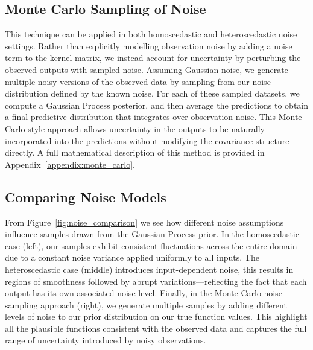 \documentclass{ucdgradtaughtthesis}
\begin{document}
\subsection{Monte Carlo Sampling of Noise}  

This technique can be applied in both homoscedastic and heteroscedastic noise settings. Rather than explicitly modelling observation noise by adding a noise term to the kernel matrix, we instead account for uncertainty by perturbing the observed outputs with sampled noise.
Assuming Gaussian noise, we generate multiple noisy versions of the observed data by sampling from our noise distribution defined by the known noise. For each of these sampled datasets, we compute a Gaussian Process posterior, and then average the predictions to obtain a final predictive distribution that integrates over observation noise.
This Monte Carlo-style approach allows uncertainty in the outputs to be naturally incorporated into the predictions without modifying the covariance structure directly. A full mathematical description of this method is provided in Appendix~\ref{appendix:monte_carlo}.

%
%
\subsection{Comparing Noise Models}
From Figure~\ref{fig:noise_comparison} we see how different noise assumptions influence samples drawn from the Gaussian Process prior. 
In the homoscedastic case (left), our samples exhibit consistent fluctuations across the entire domain due to a constant noise variance applied uniformly to all inputs. 
The heteroscedastic case (middle) introduces input-dependent noise, this results in regions of smoothness followed by abrupt variations—reflecting the fact that each output has its own associated noise level.
Finally, in the Monte Carlo noise sampling approach (right), we generate multiple samples by adding different levels of noise to our prior distribution on our true function values.
This highlight all the plausible functions consistent with the observed data and captures the full range of uncertainty introduced by noisy observations.
\end{document}
